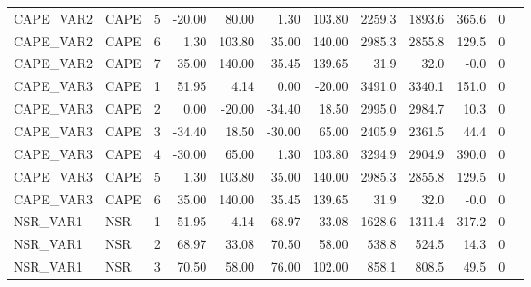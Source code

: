 \begin{tabular}{llrrrrrrrrrl}
CAPE\_VAR2 &     CAPE &        5 &    -20.00 &     80.00 &    1.30 &  103.80 &  2259.3 & 1893.6 &            365.6 &           0 &                                                    \\
CAPE\_VAR2 &     CAPE &        6 &      1.30 &    103.80 &   35.00 &  140.00 &  2985.3 & 2855.8 &            129.5 &           0 &                                                    \\
CAPE\_VAR2 &     CAPE &        7 &     35.00 &    140.00 &   35.45 &  139.65 &    31.9 &   32.0 &             -0.0 &           0 &                                                    \\
CAPE\_VAR3 &     CAPE &        1 &     51.95 &      4.14 &    0.00 &  -20.00 &  3491.0 & 3340.1 &            151.0 &           0 &                                                    \\
CAPE\_VAR3 &     CAPE &        2 &      0.00 &    -20.00 &  -34.40 &   18.50 &  2995.0 & 2984.7 &             10.3 &           0 &                                                    \\
CAPE\_VAR3 &     CAPE &        3 &    -34.40 &     18.50 &  -30.00 &   65.00 &  2405.9 & 2361.5 &             44.4 &           0 &                                                    \\
CAPE\_VAR3 &     CAPE &        4 &    -30.00 &     65.00 &    1.30 &  103.80 &  3294.9 & 2904.9 &            390.0 &           0 &                                                    \\
CAPE\_VAR3 &     CAPE &        5 &      1.30 &    103.80 &   35.00 &  140.00 &  2985.3 & 2855.8 &            129.5 &           0 &                                                    \\
CAPE\_VAR3 &     CAPE &        6 &     35.00 &    140.00 &   35.45 &  139.65 &    31.9 &   32.0 &             -0.0 &           0 &                                                    \\
 NSR\_VAR1 &      NSR &        1 &     51.95 &      4.14 &   68.97 &   33.08 &  1628.6 & 1311.4 &            317.2 &           0 &                                                    \\
 NSR\_VAR1 &      NSR &        2 &     68.97 &     33.08 &   70.50 &   58.00 &   538.8 &  524.5 &             14.3 &           0 &                                                    \\
 NSR\_VAR1 &      NSR &        3 &     70.50 &     58.00 &   76.00 &  102.00 &   858.1 &  808.5 &             49.5 &           0 &                                                    \\

\end{tabular}
